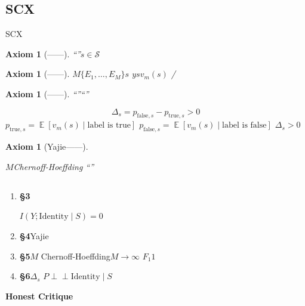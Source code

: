 \documentclass[11pt,a4paper]{article}
\newtheorem{axiom}[theorem]{Axiom}
\theoremstyle{remark}
\DeclareMathOperator{\E}{\mathbb{E}}
\newcommand{\Sstates}{\mathcal{S}}
\newcommand{\indep}{\perp\!\!\!\perp}
\begin{document}
\subsection{SCX}

SCX\cite{scx2026theorems}

\begin{axiom}[——]
\label{ax:1}
``''$s \in \Sstates$


\end{axiom}

\begin{axiom}[——]
\label{ax:2}
$M$$\{E_1, \ldots, E_M\}$$s$
$y$$s$$v_m(s)$
/
\end{axiom}

\begin{axiom}[——]
\label{ax:3}
``''``''

\begin{equation}
    \Delta_s = p_{\text{false}, s} - p_{\text{true}, s} > 0
\end{equation}
$p_{\text{true}, s} = \E[v_m(s) \mid \text{label is true}]$
$p_{\text{false}, s} = \E[v_m(s) \mid \text{label is false}]$
$\Delta_s > 0$
\end{axiom}

\begin{axiom}[Yajie——]
\label{ax:4}

$M$Chernoff-Hoeffding
``''
\end{axiom}

\subsection{}



\begin{enumerate}[label=(\arabic*)]
    \item \textbf{\S3}
          
          $I(Y; \text{Identity} \mid S) = 0$
    \item \textbf{\S4}Yajie
          
          
    \item \textbf{\S5}$M$
          Chernoff-Hoeffding$M \to \infty$
          $F_1$$1$
    \item \textbf{\S6}$\Delta_s$
          $P \indep \text{Identity} \mid S$
          
\end{enumerate}

\textbf{Honest Critique}


\end{document}
